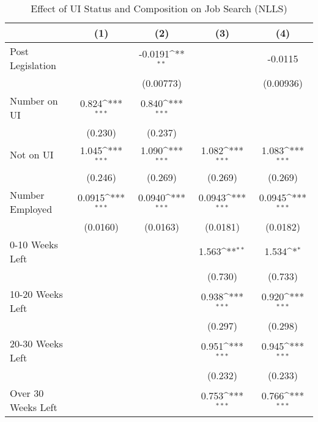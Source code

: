 \begin{table}[htbp]\centering
\small
\def\sym#1{\ifmmode^{#1}\else\(^{#1}\)\fi}
\caption{Effect of UI Status and Composition on Job Search (NLLS) \label{tab:nlls}}
\begin{tabular}{l*{4}{c}}
\hline\hline
                    &\multicolumn{1}{c}{(1)}         &\multicolumn{1}{c}{(2)}         &\multicolumn{1}{c}{(3)}         &\multicolumn{1}{c}{(4)}         \\
\hline
Post Legislation    &                     &     -0.0191\sym{**} &                     &     -0.0115         \\
                    &                     &   (0.00773)         &                     &   (0.00936)         \\
Number on UI        &       0.824\sym{***}&       0.840\sym{***}&                     &                     \\
                    &     (0.230)         &     (0.237)         &                     &                     \\
Not on UI           &       1.045\sym{***}&       1.090\sym{***}&       1.082\sym{***}&       1.083\sym{***}\\
                    &     (0.246)         &     (0.269)         &     (0.269)         &     (0.269)         \\
Number Employed     &      0.0915\sym{***}&      0.0940\sym{***}&      0.0943\sym{***}&      0.0945\sym{***}\\
                    &    (0.0160)         &    (0.0163)         &    (0.0181)         &    (0.0182)         \\
0-10 Weeks Left     &                     &                     &       1.563\sym{**} &       1.534\sym{*}  \\
                    &                     &                     &     (0.730)         &     (0.733)         \\
10-20 Weeks Left    &                     &                     &       0.938\sym{***}&       0.920\sym{***}\\
                    &                     &                     &     (0.297)         &     (0.298)         \\
20-30 Weeks Left    &                     &                     &       0.951\sym{***}&       0.945\sym{***}\\
                    &                     &                     &     (0.232)         &     (0.233)         \\
Over 30 Weeks Left  &                     &                     &       0.753\sym{***}&       0.766\sym{***}\\

\end{tabular}
\end{table}
